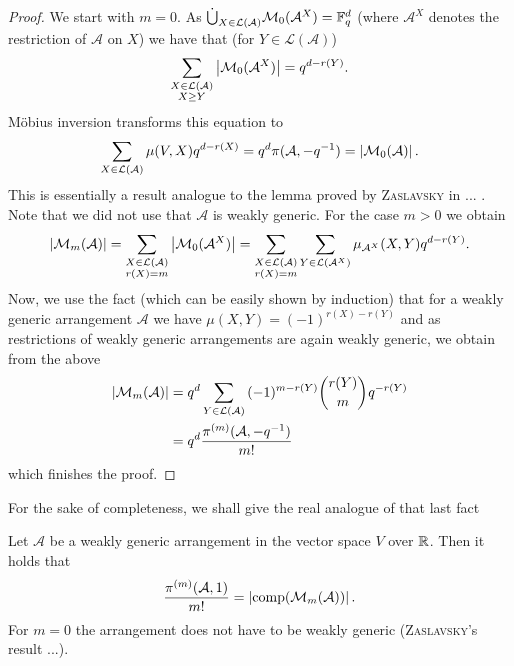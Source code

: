 \documentclass[a4paper]{article}
\begin{document}
\begin{proof}
    We start with $m=0$.
    As $\dot{\bigcup}_{X\in\mathcal{L}(\mathcal{A})}{\mathcal{M}_0(\mathcal{A}^X)}=\mathbb{F}_{q}^d$ (where $\mathcal{A}^X$ denotes the restriction of $\mathcal{A}$ on $X$) we have that (for $Y\in\mathcal{L}(\mathcal{A})$)
  \begin{equation}
      \sum_{\substack{X\in\mathcal{L}(\mathcal{A})\\ X\geq Y}}{\left|\mathcal{M}_0(\mathcal{A}^X)\right|}=q^{d-r(Y)}\text{.}
  \end{equation}
  Möbius inversion transforms this equation to
  \begin{equation}
      \sum_{X\in\mathcal{L}(\mathcal{A})}{\mu(V,X)q^{d-r(X)}} = q^d\pi(\mathcal{A},-q^{-1}) = \left|\mathcal{M}_0(\mathcal{A})\right|\text{.}
  \end{equation}
  This is essentially a result analogue to the lemma proved by \textsc{Zaslavsky} in ... . Note that we did not use that $\mathcal{A}$ is weakly generic.
  For the case $m>0$ we obtain
  \begin{equation}
      \left|\mathcal{M}_m(\mathcal{A})\right|=\sum_{\substack{X\in\mathcal{L}(\mathcal{A})\\ r(X)=m}}{\left|\mathcal{M}_0(\mathcal{A}^X)\right|}=\sum_{\substack{X\in\mathcal{L}(\mathcal{A})\\ r(X)=m}}{\sum_{Y\in\mathcal{L}(\mathcal{A}^X)}{\mu_{\mathcal{A}^X}(X,Y)q^{d-r(Y)}}}\text{.}
  \end{equation}
  Now, we use the fact (which can be easily shown by induction) that for a weakly generic arrangement $\mathcal{A}$ we have $\mu(X,Y)=(-1)^{r(X)-r(Y)}$ and as restrictions of weakly generic arrangements are again weakly generic, we obtain from the above
  \begin{align}
      \abs{\mathcal{M}_m(\mathcal{A})}
      & = q^d\sum_{Y\in\mathcal{L}(\mathcal{A})}{(-1)^{m-r(Y)}\binom{r(Y)}{m}q^{-r(Y)}}\\
      & = q^d\frac{\pi^{(m)}(\mathcal{A},-q^{-1})}{m!}
  \end{align}
  which finishes the proof.
\end{proof}

For the sake of completeness, we shall give the real analogue of that last fact

\begin{lemma} Let $\mathcal{A}$ be a weakly generic arrangement in the vector space $V$ over $\mathbb{R}$. Then it holds that
    \begin{equation}
        \frac{\pi^{(m)}(\mathcal{A},1)}{m!}=\left|\mathop\mathrm{comp}(\mathcal{\mathcal{M}}_m(\mathcal{A}))\right|\text{.}
    \end{equation}
    For $m=0$ the arrangement does not have to be weakly generic (\textsc{Zaslavsky}'s result ...).
\end{lemma}
\end{document}
